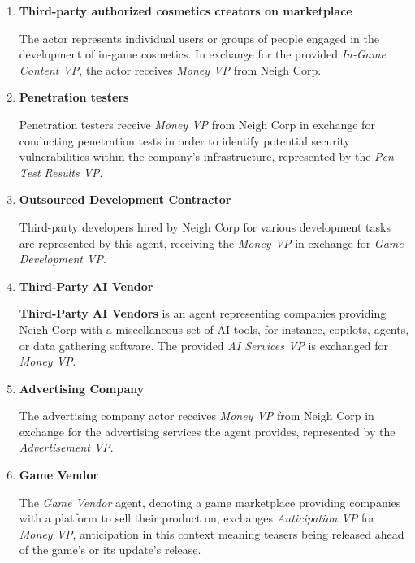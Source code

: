 \documentclass{article}
\begin{document}
\begin{enumerate}
    The \textit{Real-world brands} actor represents real-life companies wishing to engage in a partnership with Neigh Corp, provided with ad placement within the game in exchange for a monthly or one-time fee, decided on a case-by-case basis and the duration of ad placement.

    \item \textbf{Third-party authorized cosmetics creators on marketplace}

    The actor represents individual users or groups of people engaged in the development of in-game cosmetics. In exchange for the provided \textit{In-Game Content VP}, the actor receives \textit{Money VP} from Neigh Corp.

    \item \textbf{Penetration testers}

    Penetration testers receive \textit{Money VP} from Neigh Corp in exchange for conducting penetration tests in order to identify potential security vulnerabilities within the company's infrastructure, represented by the \textit{Pen-Test Results VP}.

    \item  \textbf{Outsourced Development Contractor}

    Third-party developers hired by Neigh Corp for various development tasks are represented by this agent, receiving the \textit{Money VP} in exchange for \textit{Game Development VP}.

    \item \textbf{Third-Party AI Vendor}

    \textbf{Third-Party AI Vendors} is an agent representing companies providing Neigh Corp with a miscellaneous set of AI tools, for instance, copilots, agents, or data gathering software. The provided \textit{AI Services VP} is exchanged for \textit{Money VP}.

    \item \textbf{Advertising Company}

    The advertising company actor receives \textit{Money VP} from Neigh Corp in exchange for the advertising services the agent provides, represented by the \textit{Advertisement VP}.

    \item \textbf{Game Vendor}

    The \textit{Game Vendor} agent, denoting a game marketplace providing companies with a platform to sell their product on, exchanges \textit{Anticipation VP} for \textit{Money VP}, anticipation in this context meaning teasers being released ahead of the game's or its update's release.


\end{enumerate}
\end{document}
